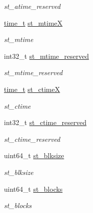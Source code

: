\begin{DoxyCompactItemize}
\begin{DoxyCompactList}\small\item\em st\_\-atime\_\-reserved \item\end{DoxyCompactList}\item 
\hyperlink{classTru64_a3346b04b0420b32ccf6b706551b70762}{time\_\-t} \hyperlink{structTru64__F64_1_1F64__stat_a34d66c07fbc0daeae3195bf330321283}{st\_\-mtimeX}
\begin{DoxyCompactList}\small\item\em st\_\-mtime \item\end{DoxyCompactList}\item 
int32\_\-t \hyperlink{structTru64__F64_1_1F64__stat_ad8e87ee941a583e8193d5c18024b559f}{st\_\-mtime\_\-reserved}
\begin{DoxyCompactList}\small\item\em st\_\-mtime\_\-reserved \item\end{DoxyCompactList}\item 
\hyperlink{classTru64_a3346b04b0420b32ccf6b706551b70762}{time\_\-t} \hyperlink{structTru64__F64_1_1F64__stat_a841e825ad73dcc00b9f2e4ef3b7c343f}{st\_\-ctimeX}
\begin{DoxyCompactList}\small\item\em st\_\-ctime \item\end{DoxyCompactList}\item 
int32\_\-t \hyperlink{structTru64__F64_1_1F64__stat_acb38cd3b14e3508432a90ccb757ec614}{st\_\-ctime\_\-reserved}
\begin{DoxyCompactList}\small\item\em st\_\-ctime\_\-reserved \item\end{DoxyCompactList}\item 
uint64\_\-t \hyperlink{structTru64__F64_1_1F64__stat_adb9252bb3343471e4aaaf7bf7df5363a}{st\_\-blksize}
\begin{DoxyCompactList}\small\item\em st\_\-blksize \item\end{DoxyCompactList}\item 
uint64\_\-t \hyperlink{structTru64__F64_1_1F64__stat_a72c24b54949be7eaac849d71fc056a3c}{st\_\-blocks}
\begin{DoxyCompactList}\small\item\em st\_\-blocks \item\end{DoxyCompactList}\end{DoxyCompactItemize}


